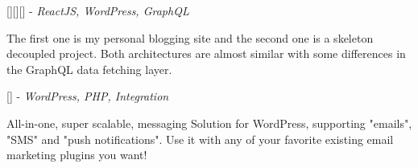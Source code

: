 \documentclass[]{resume}
\begin{document}
            [\textbf{\href{https://souptik.dev}{}}][\textbf{\href{https://github.com/Souptik2001/Souptik2001.github.io}{}}][\textbf{\href{https://github.com/Souptik2001/wp-decoupled-sample}{}}] - \textit{ReactJS, WordPress, GraphQL}

           The first one is my personal blogging site and the second one is a skeleton decoupled project. Both architectures are almost similar with some differences in the GraphQL data fetching layer.\\

           \sectionsep
           

           [\textbf{\href{https://github.com/Souptik2001/wp-messaging}{}}] - \textit{WordPress, PHP, Integration}

           All-in-one, super scalable, messaging Solution for WordPress, supporting "emails", "SMS" and "push notifications". Use it with any of your favorite existing email marketing plugins you want!

           \sectionsep


     \ 
     
\end{document}
